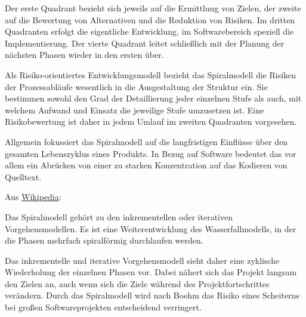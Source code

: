 \documentclass{abgabe}
\begin{document}
\begin{questions}
\begin{solution}
\begin{displayquote}
            Der erste Quadrant bezieht sich jeweils auf die Ermittlung von Zielen, der zweite auf die Bewertung von Alternativen und die Reduktion von Risiken. 
            Im dritten Quadranten erfolgt die eigentliche Entwicklung, im Softwarebereich speziell die Implementierung. 
            Der vierte Quadrant leitet schließlich mit der Planung der nächsten Phasen wieder in den ersten über.
            
            Als Risiko-orientiertes Entwicklungsmodell bezieht das Spiralmodell die Risiken der Prozessabläufe wesentlich in die Ausgestaltung der Struktur ein. 
            Sie bestimmen sowohl den Grad der Detaillierung jeder einzelnen Stufe als auch, mit welchem Aufwand und Einsatz die jeweilige Stufe umzusetzen ist. 
            Eine Risikobewertung ist daher in jedem Umlauf im zweiten Quadranten vorgesehen.
            
            Allgemein fokussiert das Spiralmodell auf die langfristigen Einflüsse über den gesamten Lebenszyklus eines Produkts. 
            In Bezug auf Software bedeutet das vor allem ein Abrücken von einer zu starken Konzentration auf das Kodieren von Quelltext.
        \end{displayquote}
        
        Aus \href{https://de.wikipedia.org/wiki/Spiralmodell}{Wikipedia}: 
        \begin{displayquote}
            Das Spiralmodell gehört zu den inkrementellen oder iterativen Vorgehensmodellen. 
            Es ist eine Weiterentwicklung des Wasserfallmodells, in der die Phasen mehrfach spiralförmig durchlaufen werden.
            
            Das inkrementelle und iterative Vorgehensmodell sieht daher eine zyklische Wiederholung der einzelnen Phasen vor. 
            Dabei nähert sich das Projekt langsam den Zielen an, auch wenn sich die Ziele während des Projektfortschrittes verändern. 
            Durch das Spiralmodell wird nach Boehm das Risiko eines Scheiterns bei großen Softwareprojekten entscheidend verringert. 
        \end{displayquote}
        

\end{solution}
\end{questions}
\end{document}
